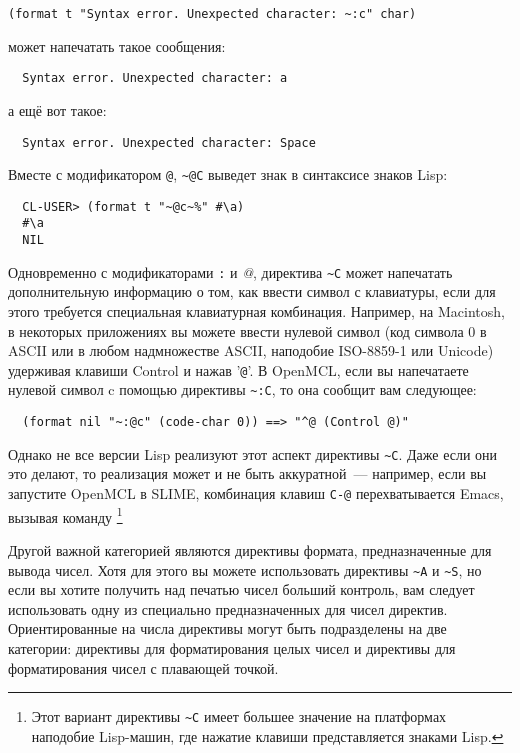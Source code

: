 \begin{lstlisting}
(format t "Syntax error. Unexpected character: ~:c" char)
\end{lstlisting}

может напечатать такое сообщения:

\begin{verbatim}
  Syntax error. Unexpected character: a
\end{verbatim}

а ещё вот такое:

\begin{verbatim}
  Syntax error. Unexpected character: Space
\end{verbatim}

Вместе с модификатором \lstinline!@!, \lstinline!~@С! выведет знак в синтаксисе знаков
Lisp:

\begin{verbatim}
  CL-USER> (format t "~@c~%" #\a)
  #\a
  NIL
\end{verbatim}

Одновременно с модификаторами \lstinline!:! и \textit{@}, директива \lstinline!~C! может
напечатать дополнительную информацию о том, как ввести символ с клавиатуры, если для этого
требуется специальная клавиатурная комбинация. Например, на Macintosh, в некоторых
приложениях вы можете ввести нулевой символ (код символа 0 в ASCII или в любом
надмножестве ASCII, наподобие ISO-8859-1 или Unicode) удерживая клавиши Control и нажав
'\lstinline!@!'. В OpenMCL, если вы напечатаете нулевой символ c помощью директивы
\lstinline!~:C!, то она сообщит вам следующее:
  
\begin{verbatim}
  (format nil "~:@c" (code-char 0)) ==> "^@ (Control @)"
\end{verbatim}

Однако не все версии Lisp реализуют этот аспект директивы \lstinline!~C!. Даже если они
это делают, то реализация может и не быть аккуратной~--- например, если вы запустите OpenMCL
в SLIME, комбинация клавиш \lstinline!C-@! перехватывается Emacs, вызывая команду
\footnote{Этот вариант директивы \lstinline!~C! имеет большее
  значение на платформах наподобие Lisp-машин, где нажатие клавиши представляется знаками
  Lisp.}
	
Другой важной категорией являются директивы формата, предназначенные для вывода
чисел. Хотя для этого вы можете использовать директивы \lstinline!~A! и \lstinline!~S!, но
если вы хотите получить над печатью чисел больший контроль, вам следует использовать одну
из специально предназначенных для чисел директив. Ориентированные на числа директивы могут
быть подразделены на две категории: директивы для форматирования целых чисел и директивы
для форматирования чисел с плавающей точкой.


